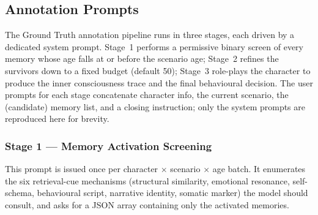 \subsection{Annotation Prompts}
\label{app:prompt_annotation}

The Ground Truth annotation pipeline runs in three stages, each driven by a dedicated system prompt. Stage~1 performs a permissive binary screen of every memory whose age falls at or before the scenario age; Stage~2 refines the survivors down to a fixed budget (default 50); Stage~3 role-plays the character to produce the inner consciousness trace and the final behavioural decision. The user prompts for each stage concatenate character info, the current scenario, the (candidate) memory list, and a closing instruction; only the system prompts are reproduced here for brevity.

\subsubsection{Stage 1 — Memory Activation Screening}
\label{app:prompt_activation}

This prompt is issued once per character $\times$ scenario $\times$ age batch. It enumerates the six retrieval-cue mechanisms (structural similarity, emotional resonance, self-schema, behavioural script, narrative identity, somatic marker) the model should consult, and asks for a JSON array containing only the activated memories.

